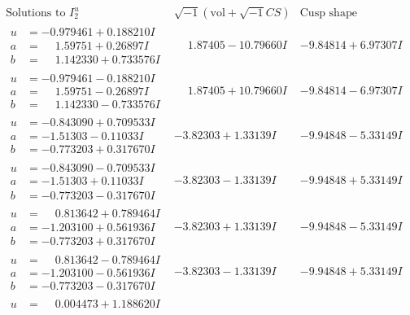 \documentclass[1p]{elsarticle_modified}
\theoremstyle{definition}
\newcommand{\I}{\sqrt{-1}}
\begin{document}
$$\begin{array}{c|c|c}  
\text{Solutions to }I^u_{2}& \I (\text{vol} + \sqrt{-1}CS) & \text{Cusp shape}\\
 \hline 
\begin{aligned}
u &= -0.979461 + 0.188210 I \\
a &= \phantom{-}1.59751 + 0.26897 I \\
b &= \phantom{-}1.142330 + 0.733576 I\end{aligned}
 & \phantom{-}1.87405 - 10.79660 I & -9.84814 + 6.97307 I \\ \hline\begin{aligned}
u &= -0.979461 - 0.188210 I \\
a &= \phantom{-}1.59751 - 0.26897 I \\
b &= \phantom{-}1.142330 - 0.733576 I\end{aligned}
 & \phantom{-}1.87405 + 10.79660 I & -9.84814 - 6.97307 I \\ \hline\begin{aligned}
u &= -0.843090 + 0.709533 I \\
a &= -1.51303 - 0.11033 I \\
b &= -0.773203 + 0.317670 I\end{aligned}
 & -3.82303 + 1.33139 I & -9.94848 - 5.33149 I \\ \hline\begin{aligned}
u &= -0.843090 - 0.709533 I \\
a &= -1.51303 + 0.11033 I \\
b &= -0.773203 - 0.317670 I\end{aligned}
 & -3.82303 - 1.33139 I & -9.94848 + 5.33149 I \\ \hline\begin{aligned}
u &= \phantom{-}0.813642 + 0.789464 I \\
a &= -1.203100 + 0.561936 I \\
b &= -0.773203 + 0.317670 I\end{aligned}
 & -3.82303 + 1.33139 I & -9.94848 - 5.33149 I \\ \hline\begin{aligned}
u &= \phantom{-}0.813642 - 0.789464 I \\
a &= -1.203100 - 0.561936 I \\
b &= -0.773203 - 0.317670 I\end{aligned}
 & -3.82303 - 1.33139 I & -9.94848 + 5.33149 I \\ \hline\begin{aligned}
u &= \phantom{-}0.004473 + 1.188620 I \\

\end{aligned}
\end{array}$$
\end{document}
